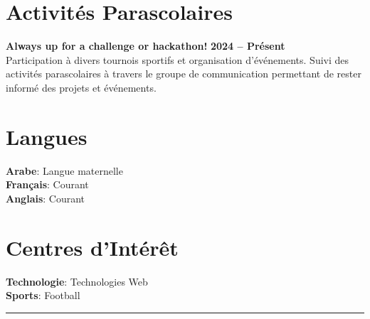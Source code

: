 \documentclass[A4,11pt]{article}
\begin{document}
\section{\faUsers \hspace{0.2cm} Activités Parascolaires}
\begin{itemize}[leftmargin=0.4cm, label={}]
    \small{\item{
        \textbf{\color{accentcolor}Always up for a challenge or hackathon!} \hfill \textbf{2024 -- Présent} \\[1pt]
        \color{darkgray}Participation à divers tournois sportifs et organisation d'événements. Suivi des activités parascolaires à travers le groupe de communication permettant de rester informé des projets et événements.
    }}
\end{itemize}

\begin{minipage}[t]{0.48\textwidth}
\section{\faLanguage \hspace{0.2cm} Langues}
\begin{itemize}[leftmargin=0.4cm, label={}]
    \small{\item{
        \textbf{\color{primarycolor}Arabe}{: \color{darkgray}Langue maternelle} \\[0pt]
        \textbf{\color{primarycolor}Français}{: \color{darkgray}Courant} \\[0pt]
        \textbf{\color{primarycolor}Anglais}{: \color{darkgray}Courant}
    }}
\end{itemize}
\end{minipage}
\hfill
\begin{minipage}[t]{0.48\textwidth}
\section{\faHeart \hspace{0.2cm} Centres d'Intérêt}
\begin{itemize}[leftmargin=0.4cm, label={}]
    \small{\item{
        \textbf{\color{primarycolor}Technologie}{: \color{darkgray} Technologies Web} \\[0pt]
        \textbf{\color{primarycolor}Sports}{: \color{darkgray}Football}
    }}
\end{itemize}
\end{minipage}

\vspace{2pt}
\begin{center}
    {\color{primarycolor}\rule{0.5\textwidth}{1pt}}
\end{center}
\end{document}
